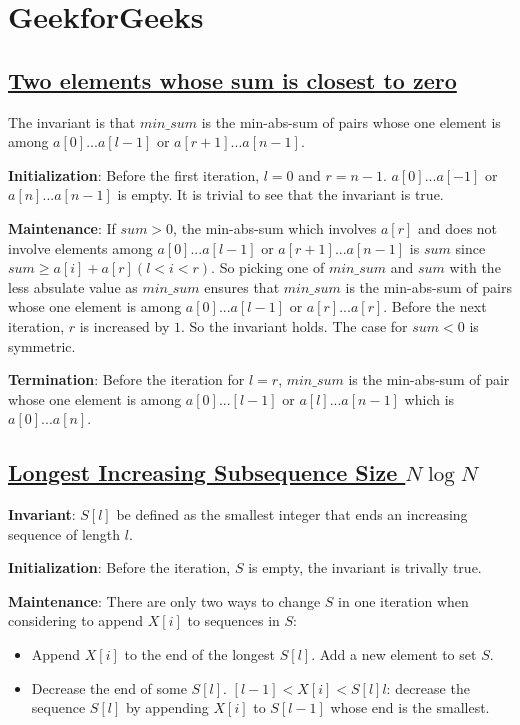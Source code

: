 \documentclass{book}
\begin{document}
\chapter{GeekforGeeks}

\section{\href{http://www.geeksforgeeks.org/two-elements-whose-sum-is-closest-to-zero}{Two elements whose sum is closest to zero}}

The invariant is that $min\_sum$ is the min-abs-sum of pairs whose one element
is among $a[0]...a[l-1]$ or $a[r+1]...a[n-1]$.

\textbf{Initialization}: Before the first iteration, $l = 0$ and $r = n- 1$.
$a[0]...a[-1]$ or $a[n]...a[n-1]$ is empty. It is trivial to see that
the invariant is true.

\textbf{Maintenance}: If $sum > 0$, the min-abs-sum which involves $a[r]$ and
does not involve elements among $a[0]...a[l-1]$ or $a[r+1]...a[n-1]$ is $sum$
since $sum \ge a[i] + a[r] (l < i < r)$. So picking one of  $min\_sum$ and $sum$
with the less absulate value as $min\_sum$ ensures that $min\_sum$ is the
min-abs-sum of pairs whose one element is among $a[0]...a[l-1]$ or
$a[r]...a[r]$.  Before the next iteration, $r$ is increased by $1$. So the
invariant holds.  The case for $sum < 0$ is symmetric.

\textbf{Termination}: Before the iteration for $l = r$, $min\_sum$ is the
min-abs-sum of pair whose one element is among $a[0]...[l-1]$ or
$a[l]...a[n-1]$ which is $a[0]...a[n]$.

\section{\href{http://www.geeksforgeeks.org/longest-monotonically-increasing-subsequence-size-n-log-n/}{Longest
Increasing Subsequence Size $N\log N$}}

\textbf{Invariant}: $S[l]$ be defined as the smallest integer that ends an
increasing sequence of length $l$.

\textbf{Initialization}: Before the iteration, $S$ is empty, the invariant is trivally true.

\textbf{Maintenance}: There are only two ways to change $S$ in one iteration
when considering to append $X[i]$ to sequences in $S$:
\begin{itemize}
\item Append $X[i]$ to the end of the longest $S[l]$. Add a new element to set
$S$.
\item Decrease the end of some $S[l]$. $[l-1] < X[i] < S[l]l$:
decrease the sequence $S[l]$ by appending $X[i]$ to $S[l-1]$ whose end is the
smallest.
\end{itemize}
\end{document}
